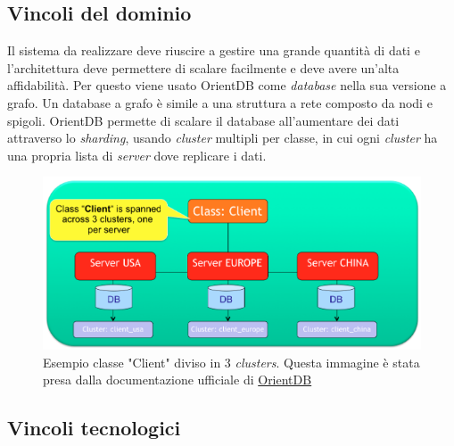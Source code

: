 \subsection{Vincoli del dominio}
Il sistema da realizzare deve riuscire a gestire una grande quantità di dati e l'architettura deve permettere di scalare facilmente e deve avere un'alta affidabilità. Per questo viene usato OrientDB come \textit{database} nella sua versione a grafo. Un database a grafo è simile a una struttura a rete composto da nodi e spigoli. OrientDB permette di scalare il database all'aumentare dei dati attraverso lo \textit{sharding}, usando \textit{cluster} multipli per classe, in cui ogni \textit{cluster} ha una propria lista di \textit{server} dove replicare i dati.
\begin{figure}[h]
\centering
\includegraphics[width=0.9\linewidth]{immagini/distributed-sharding-class}
\caption[Esempio classe "Client" diviso in 3 clusters]{Esempio classe "Client" diviso in 3 \textit{clusters}. Questa immagine è stata presa dalla documentazione ufficiale di \href{http://orientdb.com/docs/last/Distributed-Sharding.html}{OrientDB}}
\label{fig:distributed-sharding-class}
\end{figure}

\subsection{Vincoli tecnologici}
